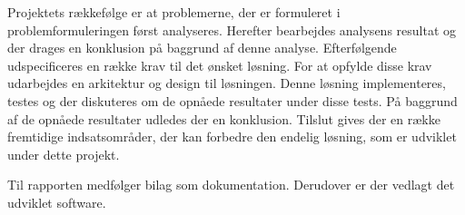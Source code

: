  
Projektets rækkefølge er at problemerne, der er formuleret i problemformuleringen først analyseres. Herefter bearbejdes analysens resultat og der drages en konklusion på baggrund af denne analyse. Efterfølgende udspecificeres en række krav til det ønsket løsning. For at opfylde disse krav udarbejdes en arkitektur og design til løsningen. Denne løsning implementeres, testes og der diskuteres om de opnåede resultater under disse tests. På baggrund af de opnåede resultater udledes der en konklusion. Tilslut gives der en række fremtidige indsatsområder, der kan forbedre den endelig løsning, som er udviklet under dette projekt. 

Til rapporten medfølger bilag som dokumentation. Derudover er der vedlagt det udviklet software. 













